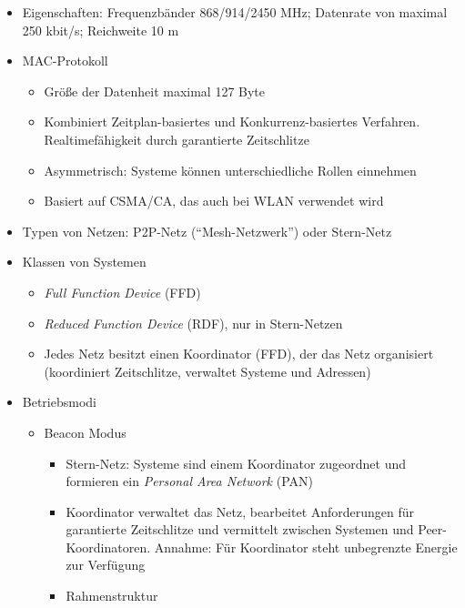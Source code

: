 \begin{itemize}
\begin{itemize}
		\item Eigenschaften: Frequenzbänder 868/914/2450 MHz; Datenrate von maximal 250 kbit/s; Reichweite 10 m
		\item MAC-Protokoll
		\begin{itemize}
			\item Größe der Datenheit maximal 127 Byte
			\item Kombiniert Zeitplan-basiertes und Konkurrenz-basiertes Verfahren. Realtimefähigkeit durch garantierte Zeitschlitze
			\item Asymmetrisch: Systeme können unterschiedliche Rollen einnehmen
			\item Basiert auf CSMA/CA, das auch bei WLAN verwendet wird
		\end{itemize}
		\item Typen von Netzen: P2P-Netz ("`Mesh-Netzwerk"') oder Stern-Netz
		\item Klassen von Systemen
		\begin{itemize}
			\item \textit{Full Function Device} (FFD)
			\item \textit{Reduced Function Device} (RDF), nur in Stern-Netzen
			\item Jedes Netz besitzt einen Koordinator (FFD), der das Netz organisiert (koordiniert Zeitschlitze, verwaltet Systeme und Adressen)
		\end{itemize}
		\item Betriebsmodi
		\begin{itemize}
			\item Beacon Modus
			\begin{itemize}
				\item Stern-Netz: Systeme sind einem Koordinator zugeordnet und formieren ein \textit{Personal Area Network} (PAN)
				\item Koordinator verwaltet das Netz, bearbeitet Anforderungen für garantierte Zeitschlitze und vermittelt zwischen Systemen und Peer-Koordinatoren. Annahme: Für Koordinator steht unbegrenzte Energie zur Verfügung
				\item Rahmenstruktur
\end{itemize}
\end{itemize}
\end{itemize}
\end{itemize}
